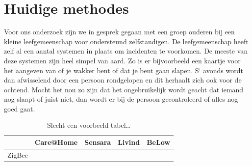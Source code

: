 \documentclass{below-ext}
\newcommand{\cmark}{\ding{51}}%
\newcommand{\xmark}{\ding{55}}%
\begin{document}
\section{Huidige methodes}
Voor ons onderzoek zijn we in gesprek gegaan met een groep ouderen bij een kleine leefgemeenschap voor ondersteund zelfstandigen. 
De leefgemeenschap heeft zelf al een aantal systemen in plaats om incidenten te voorkomen. De meeste van deze systemen zijn heel simpel van aard. Zo is er bijvoorbeeld een kaartje voor het aangeven van of je wakker bent of dat je bent gaan slapen. S` avonds wordt dan afwisselend door een persoon rondgelopen en dit herhaalt zich ook voor de ochtend. Mocht het nou zo zijn dat het ongebruikelijk wordt geacht dat iemand nog slaapt of juist niet, dan wordt er bij de persoon gecontroleerd of alles nog goed gaat.\cite{nivel}



\begin{table}
\begin{tabular}{l|l|l|l|l}
& Care@Home & Sensara & Livind & BeLow \\
\hline
ZigBee & \cmark & \cmark & \cmark & \xmark \\
\end{tabular}
\caption{Slecht een voorbeeld tabel\ldots}
\end{table}
\end{document}
